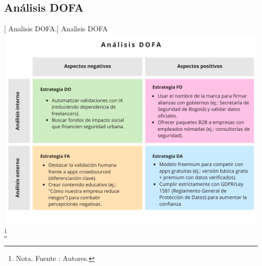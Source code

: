 \subsection{Análisis DOFA}
\begin{minipage}{0.9\textwidth}
\centering
{}[{ Analisis DOFA.}]{  Analisis DOFA }
\label{dofa}
\includegraphics[scale=0.4]{Content/Images/analisis-dofa.png}
\footnote{Nota. \textup{Fuente : Autores.}}
\end{minipage}